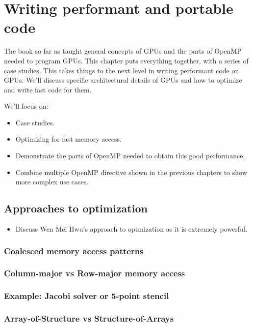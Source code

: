

\chapter{Writing performant and portable code}
\label{chapter:portable}

The book so far as taught general concepts of GPUs and the parts of OpenMP needed to program GPUs.
This chapter puts everything together, with a series of case studies.
This takes things to the next level in writing performant code on GPUs.
We'll discuss specific architectural details of GPUs and how to optimize and write fast code for them.

We'll focus on:
\begin{itemize}
  \item Case studies.
  \item Optimizing for fast memory access.
  \item Demonstrate the parts of OpenMP needed to obtain this good performance.
  \item Combine multiple OpenMP directive shown in the previous chapters to show more complex use cases.
\end{itemize}

\section{Approaches to optimization}
\begin{itemize}
  \item Discuss Wen Mei Hwu's approach to optmization as it is extremely powerful.
\end{itemize}

\subsection{Coalesced memory access patterns}
\subsection{Column-major vs Row-major memory access}
\subsection{Example: Jacobi solver or 5-point stencil}

\subsection{Array-of-Structure vs Structure-of-Arrays}
